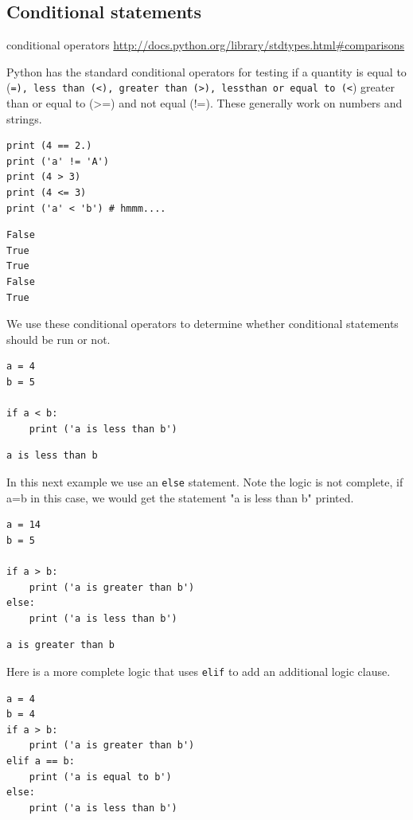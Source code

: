 \documentclass[11pt]{article}
\begin{document}
\subsection{Conditional statements}
\label{sec:org2fa9367}
conditional operators \url{http://docs.python.org/library/stdtypes.html\#comparisons}

Python has the standard conditional operators for testing if a quantity is equal to (\texttt{=), less than (<), greater than (>), lessthan or equal to (<}) greater than or equal to (>=) and not equal (!=). These generally work on numbers and strings.

\begin{verbatim}
print (4 == 2.)
print ('a' != 'A')
print (4 > 3)
print (4 <= 3)
print ('a' < 'b') # hmmm....
\end{verbatim}

\begin{verbatim}
False
True
True
False
True
\end{verbatim}

We use these conditional operators to determine whether conditional statements should be run or not.

\begin{verbatim}
a = 4
b = 5

if a < b:
    print ('a is less than b')
\end{verbatim}

\begin{verbatim}
a is less than b
\end{verbatim}

In this next example we use an \texttt{else} statement. Note the logic is not complete, if a=b in this case, we would get the statement "a is less than b" printed.
\begin{verbatim}
a = 14
b = 5

if a > b:
    print ('a is greater than b')
else:
    print ('a is less than b')
\end{verbatim}

\begin{verbatim}
a is greater than b
\end{verbatim}

Here is a more complete logic that uses \texttt{elif} to add an additional logic clause.
\begin{verbatim}
a = 4
b = 4
if a > b:
    print ('a is greater than b')
elif a == b:
    print ('a is equal to b')
else:
    print ('a is less than b')
\end{verbatim}
\end{document}
